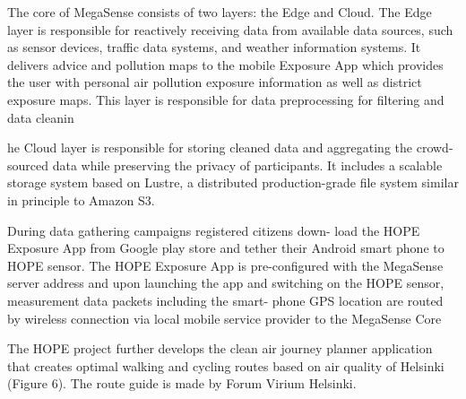 		The core of MegaSense consists of two layers: the Edge and
		Cloud. The Edge layer is responsible for reactively receiving
		data from available data sources, such as sensor devices,
		traffic data systems, and weather information systems. It
		delivers advice and pollution maps to the mobile Exposure App
		which provides the user with personal air pollution exposure
		information as well as district exposure maps.
		This layer is responsible for data preprocessing for filtering
		and data cleanin
		
		he Cloud layer is responsible for storing cleaned data
		and aggregating the crowd-sourced data while preserving the
		privacy of participants. It includes a scalable storage system
		based on Lustre, a distributed production-grade file system
		similar in principle to Amazon S3.
		
		During data gathering campaigns registered citizens down-
		load the HOPE Exposure App from Google play store and
		tether their Android smart phone to HOPE sensor. The HOPE
		Exposure App is pre-configured with the MegaSense server
		address and upon launching the app and switching on the
		HOPE sensor, measurement data packets including the smart-
		phone GPS location are routed by wireless connection via local
		mobile service provider to the MegaSense Core
		
		The HOPE project further develops the clean air journey
		planner application that creates optimal walking and cycling
		routes based on air quality of Helsinki (Figure 6). The route
		guide is made by Forum Virium Helsinki.